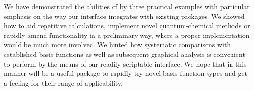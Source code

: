 We have demonstrated the abilities of \molsturm
by three practical examples with particular emphasis
on the way our \python interface integrates with existing
\python packages.
We showed how to aid repetitive calculations,
implement novel quantum-chemical methods
or rapidly amend functionality in a preliminary way,
where a proper implementation would be much more involved.
We hinted how
systematic comparisons with established basis functions
as well as subsequent graphical analysis
is convenient to perform by the means of our
readily scriptable interface.
We hope that in this manner \molsturm
will be a useful package to rapidly try novel basis function types
and get a feeling for their range of applicability.

